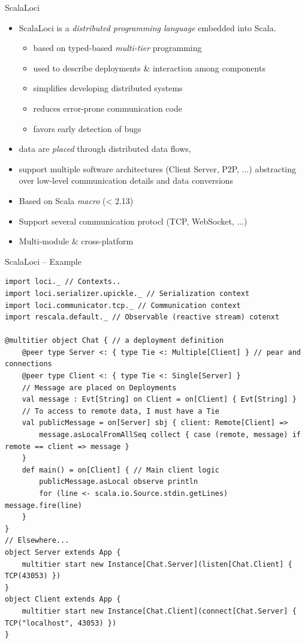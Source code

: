 \documentclass[presentation, 9pt]{beamer}\mode<presentation>{\usetheme{AMSBolognaFC}}
\begin{document}
\begin{frame}{ScalaLoci}
\begin{itemize}
	\item ScalaLoci is a \emph{distributed programming language} embedded into Scala.
 	\begin{itemize}
		\item based on typed-based \emph{multi-tier} programming
  	\item used to describe deployments \& interaction among components
		 \item simplifies developing distributed systems
   	\item reduces error-prone communication code
    \item favors early detection of bugs
	 \end{itemize}
	 \item data are \emph{placed} through distributed data flows, 
	 \item support multiple software architectures (Client Server, P2P, ...) abstracting over low-level communication details and data conversions
	 \item Based on Scala \emph{macro} (< 2.13)
   \item Support several communication protocl (TCP, WebSocket, ...)
   \item Multi-module \& cross-platform 
\end{itemize}
\end{frame}
\begin{frame}[fragile]{ScalaLoci -- Example}
	\begin{alertblock}{}
		\begin{tcolorbox}[left=0pt, top=0pt, bottom=0pt]
			\begin{verbatim}
import loci._ // Contexts..
import loci.serializer.upickle._ // Serialization context
import loci.communicator.tcp._ // Communication context
import rescala.default._ // Observable (reactive stream) cotenxt

@multitier object Chat { // a deployment definition
	@peer type Server <: { type Tie <: Multiple[Client] } // pear and connections
	@peer type Client <: { type Tie <: Single[Server] }
	// Message are placed on Deployments
	val message : Evt[String] on Client = on[Client] { Evt[String] }
	// To access to remote data, I must have a Tie
	val publicMessage = on[Server] sbj { client: Remote[Client] =>
		message.asLocalFromAllSeq collect { case (remote, message) if remote == client => message }
	}
	def main() = on[Client] { // Main client logic
		publicMessage.asLocal observe println
		for (line <- scala.io.Source.stdin.getLines) message.fire(line)
	}
}
// Elsewhere...
object Server extends App {
	multitier start new Instance[Chat.Server](listen[Chat.Client] { TCP(43053) })
}
object Client extends App {
	multitier start new Instance[Chat.Client](connect[Chat.Server] { TCP("localhost", 43053) })
}
			\end{verbatim}
		\end{tcolorbox}
	\end{alertblock}
\end{frame}
\frame{\titlepage}
\end{document}
